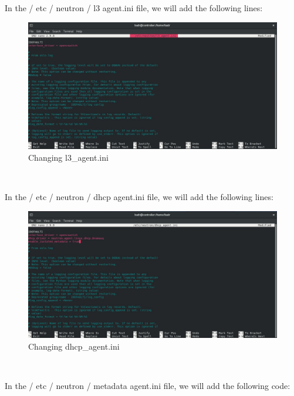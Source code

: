 \begin{spacing}{1.2}
\par In the / etc / neutron / l3 agent.ini file, we will add the following lines: 
\\
\begin{figure}[!htb] 
\begin{center} 
\includegraphics[width=1\linewidth]{Cloud/Installing and Configuring Neutron services/Changing l3_agent.ini} 
\end{center} 
\caption{Changing l3_agent.ini} 
\end{figure} 
\FloatBarrier
\\
\par In the / etc / neutron / dhcp agent.ini file, we will add the following lines: 
\\
\begin{figure}[!htb] 
\begin{center} 
\includegraphics[width=1\linewidth]{Cloud/Installing and Configuring Neutron services/Changing dhcp_agent.ini} 
\end{center} 
\caption{Changing dhcp_agent.ini} 
\end{figure} 
\FloatBarrier
\\
\par In the / etc / neutron / metadata agent.ini file, we will add the following code: 

\end{spacing}
